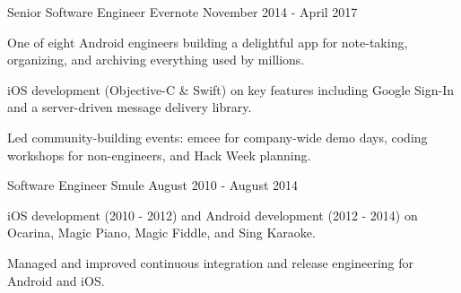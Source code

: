 \begin{cventries}
  \cventry
    {Senior Software Engineer} %
    {Evernote} %
    {} %
    {November 2014 - April 2017} %
    {
	\begin{cvitems} %
      	\item {One of eight Android engineers building a delightful app for note-taking, organizing, and archiving everything used by millions.}
	\item {iOS development (Objective-C \& Swift) on key features including Google Sign-In and a server-driven message delivery library.}
	\item {Led community-building events: emcee for company-wide demo days, coding workshops for non-engineers, and Hack Week planning.}
	\end{cvitems}
    }
    
  \cventry
    {Software Engineer} %
    {Smule} %
    {} %
    {August 2010 - August 2014} %
    {
      \begin{cvitems} %
       \item {iOS development (2010 - 2012) and Android development (2012 - 2014) on Ocarina, Magic Piano, Magic Fiddle, and Sing Karaoke.}
        \item {Managed and improved continuous integration and release engineering for Android and iOS.}
      \end{cvitems}
    }
    

\end{cventries}
